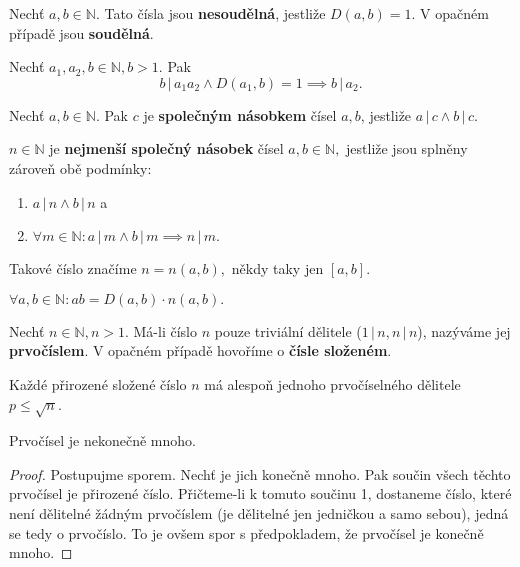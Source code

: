 \begin{definition}
  Nechť $a,b\in \mathbb N.$ Tato čísla jsou \textbf{nesoudělná}, jestliže $D(a,b)=1$. V opačném případě jsou \textbf{soudělná}.
\end{definition}

\begin{veta}
  Nechť $a_1,a_2,b\in \mathbb N, b>1.$ Pak
  $$b \, | \, a_1a_2 \land D(a_1,b)=1\implies b\, | \, a_2.$$
\end{veta}

\begin{definition}
  Nechť $a,b\in \mathbb N.$ Pak $c$ je \textbf{společným násobkem} čísel $a,b$, jestliže $a \, | \, c \land b\, | \, c.$
\end{definition}

\begin{definition}
  $n\in \mathbb N$ je \textbf{nejmenší společný násobek} čísel $a,b \in \mathbb N,$ jestliže jsou splněny zároveň obě podmínky:
  \begin{enumerate}[$i.$]
    \item $a\, | \, n \land b \, | \, n$ a
    \item $\forall m \in \mathbb N: a \, | \, m \land b \, | \, m \implies n \, | \, m.$
  \end{enumerate}
  Takové číslo značíme $n=n(a,b), $ někdy taky jen $\left [ a,b\right ]$.
\end{definition}

\begin{veta}
  $\forall a,b \in \mathbb N: ab=D(a,b)\cdot n(a,b).$
\end{veta}

\begin{definition}
  Nechť $n\in \mathbb N, n>1.$ Má-li číslo $n$ pouze triviální dělitele ($1 \, | \, n, n \, | \, n$), nazýváme jej \textbf{prvočíslem}. V opačném případě hovoříme o \textbf{čísle složeném}.
\end{definition}

\begin{veta}
  Každé přirozené složené číslo $n$ má alespoň jednoho prvočíselného dělitele $p\leq \sqrt{n}$.
\end{veta}

\begin{veta}
  Prvočísel je nekonečně mnoho.
\end{veta}

\begin{proof}
  Postupujme sporem. Nechť je jich konečně mnoho. Pak součin všech těchto prvočísel je přirozené číslo.
  Přičteme-li k tomuto součinu 1, dostaneme číslo, které není dělitelné žádným prvočíslem (je dělitelné jen
  jedničkou a samo sebou), jedná se tedy o prvočíslo. To je ovšem spor s předpokladem, že prvočísel je konečně mnoho.
\end{proof}

